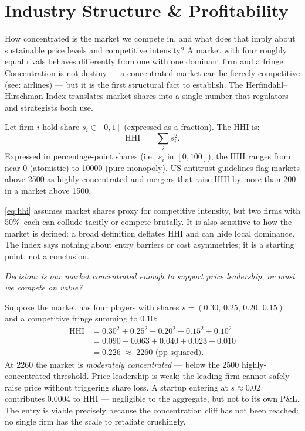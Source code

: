 \section{Industry Structure \& Profitability}\label{sec:industry-structure}

How concentrated is the market we compete in, and what does that imply about sustainable
price levels and competitive intensity? A market with four roughly equal rivals behaves
differently from one with one dominant firm and a fringe. Concentration is not destiny ---
a concentrated market can be fiercely competitive (see: airlines) --- but it is the first
structural fact to establish. The Herfindahl--Hirschman Index translates market shares into
a single number that regulators and strategists both use.

Let firm \(i\) hold share \(s_i \in [0,1]\) (expressed as a fraction). The HHI is:
\begin{equation}\label{eq:hhi}
  \mathrm{HHI} \;=\; \sum_{i} s_i^2.
\end{equation}
Expressed in percentage-point shares (i.e.\ \(s_i\) in \([0,100]\)), the HHI ranges from
near 0 (atomistic) to \num{10000} (pure monopoly). US antitrust guidelines
\parencite{dranove7theconomics} flag markets above \num{2500} as highly concentrated and
mergers that raise HHI by more than \num{200} in a market above \num{1500}.

\cref{eq:hhi} assumes market shares proxy for competitive intensity, but two firms with
50\%\ each can collude tacitly or compete brutally. It is also sensitive to how the market
is defined: a broad definition deflates HHI and can hide local dominance. The index says
nothing about entry barriers or cost asymmetries; it is a starting point, not a conclusion.

\begin{example}
\emph{Decision: is our market concentrated enough to support price leadership, or must we
compete on value?}

Suppose the market has four players with shares
\(s = (0.30,\,0.25,\,0.20,\,0.15)\) and a competitive fringe summing to \(0.10\):
\[
  \begin{aligned}
    \mathrm{HHI} &= 0.30^2 + 0.25^2 + 0.20^2 + 0.15^2 + 0.10^2 \\
                 &= 0.090 + 0.063 + 0.040 + 0.023 + 0.010 \\
                 &= 0.226 \;\approx\; \num{2260}\text{ (pp-squared)}.
  \end{aligned}
\]
At \num{2260} the market is \emph{moderately concentrated} --- below the \num{2500}
highly-concentrated threshold. Price leadership is weak; the leading firm cannot safely
raise price without triggering share loss. A startup entering at \(s \approx 0.02\)
contributes \(0.0004\) to HHI --- negligible to the aggregate, but not to its own P\&L.
The entry is viable precisely because the concentration cliff has not been reached: no
single firm has the scale to retaliate crushingly.
\end{example}

